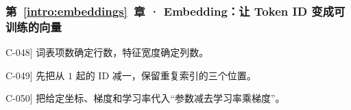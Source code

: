 \subsubsection*{第~\ref*{intro:embeddings}~章 · Embedding：让 Token ID 变成可训练的向量}
\begin{answerhints}
\item[\hyperref[exercise:embedding-shape]{C-048}] \leavevmode{}\label{hint:embedding-shape}词表项数确定行数，特征宽度确定列数。
\item[\hyperref[exercise:embedding-input-change]{C-049}] \leavevmode{}\label{hint:embedding-input-change}先把从 $1$ 起的 ID 减一，保留重复索引的三个位置。
\item[\hyperref[exercise:embedding-update]{C-050}] \leavevmode{}\label{hint:embedding-update}把给定坐标、梯度和学习率代入“参数减去学习率乘梯度”。
\end{answerhints}
